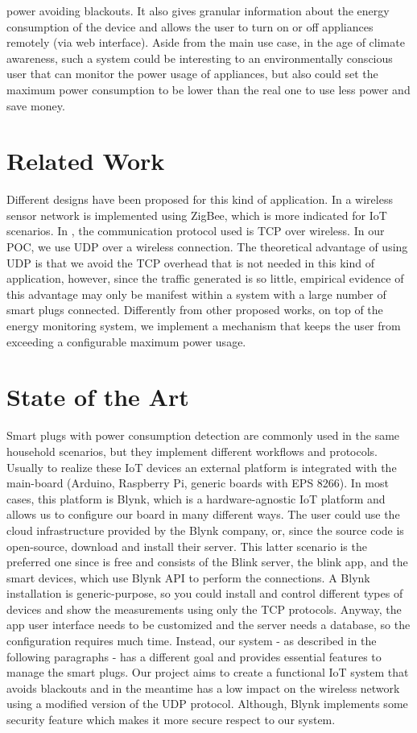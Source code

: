 \documentclass[conference]{IEEEtran}
\begin{document}
power avoiding blackouts. It also gives granular information about the energy consumption of the device and allows the user to turn on or off appliances remotely (via web interface). Aside from the main use case, in the age of climate awareness, such a system could be interesting to an environmentally conscious user that can monitor the power usage of appliances, but also could set the maximum power consumption to be lower than the real one to use less power and save money.
	
	\section{Related Work}
	Different designs have been proposed for this kind of application. In \cite{7884488} a wireless sensor network is implemented using ZigBee, which is more indicated for IoT scenarios. In \cite{8612412}, \cite{8110428} the communication protocol used is TCP over wireless. In our POC, we use UDP over a wireless connection. The theoretical advantage of using UDP is that we avoid the TCP overhead that is not needed in this kind of application, however, since the traffic generated is so little, empirical evidence of this advantage may only be manifest within a system with a large number of smart plugs connected. Differently from other proposed works, on top of the energy monitoring system, we implement a mechanism that keeps the user from exceeding a configurable maximum power usage. 
	
	\section{State of the Art}
	Smart plugs with power consumption detection are commonly
	used in the same household scenarios, but they implement
	different workflows and protocols. Usually to
	realize these IoT devices an external platform is integrated
	with the main-board (Arduino, Raspberry Pi, generic boards
	with EPS 8266). In most cases, this platform is Blynk, which
	is a hardware-agnostic IoT platform and allows us to configure
	our board in many different ways. The user could use the
	cloud infrastructure provided by the Blynk company, or, since
	the source code is open-source, download and install their server. This latter scenario is the preferred one since is free
	and consists of the Blink server, the blink app, and the smart
	devices, which use Blynk API to perform the connections. A
	Blynk installation is generic-purpose, so you could install and
	control different types of devices and show the measurements
	using only the TCP protocols. Anyway, the app user interface
	needs to be customized and the server needs a database, so
	the configuration requires much time. Instead, our system -
	as described in the following paragraphs - has a different goal
	and provides essential features to manage the smart plugs. Our project aims to create a functional IoT system that
	avoids blackouts and in the meantime has a low impact on
	the wireless network using a modified version of the UDP
	protocol. Although, Blynk implements some security feature
	which makes it more secure respect to our system.
\end{document}
